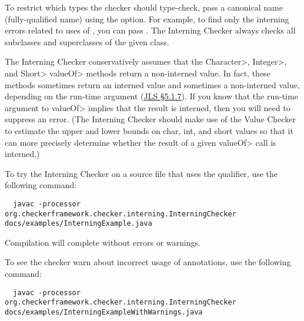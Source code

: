 \label{checking-class}
To restrict which types the checker should type-check, pass a canonical
name (fully-qualified name) using the  option.
For example, to find only the
interning errors related to uses of , you can pass
.  The Interning Checker always checks all
subclasses and superclasses of the given class.




The Interning Checker conservatively assumes that the \<Character>, \<Integer>,
and \<Short> \<valueOf> methods return a non-interned value.  In fact, these
methods sometimes return an interned value and sometimes a non-interned
value, depending on the run-time argument (\href{https://docs.oracle.com/javase/specs/jls/se17/html/jls-5.html#jls-5.1.7}{JLS
\S5.1.7}).  If you know that the run-time argument to \<valueOf> implies that
the result is interned, then you will need to suppress an error.
(The Interning Checker should make use of the Value Checker to estimate the upper
and lower bounds on char, int, and short values so that it can more
precisely determine whether the result of a given \<valueOf> call is
interned.)




To try the Interning Checker on a source file that uses the  qualifier,
use the following command:

\begin{mysmall}
\begin{Verbatim}
  javac -processor org.checkerframework.checker.interning.InterningChecker docs/examples/InterningExample.java
\end{Verbatim}
\end{mysmall}

\noindent
Compilation will complete without errors or warnings.

To see the checker warn about incorrect usage of annotations, use the following
command:

\begin{mysmall}
\begin{Verbatim}
  javac -processor org.checkerframework.checker.interning.InterningChecker docs/examples/InterningExampleWithWarnings.java
\end{Verbatim}
\end{mysmall}


